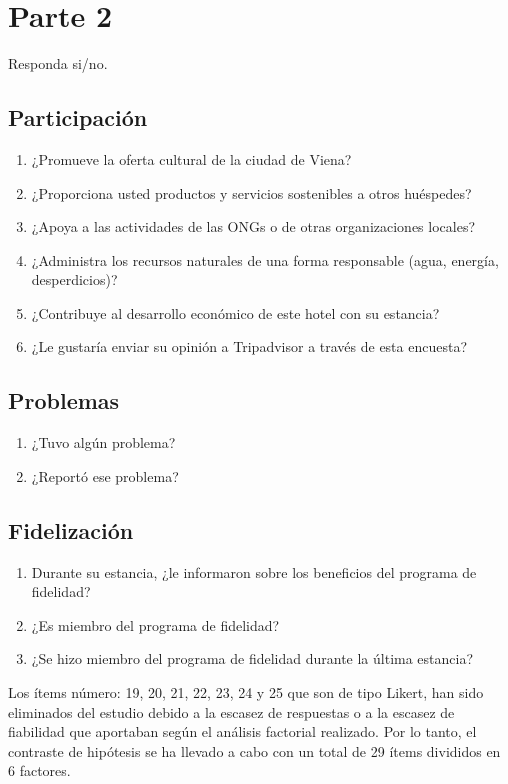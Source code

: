 \section*{Parte 2}
Responda si/no.


\subsection*{Participación}
\begin{enumerate}
	\item ¿Promueve la oferta cultural de la ciudad de Viena?
	\item ¿Proporciona usted productos y servicios sostenibles a otros huéspedes?
	\item ¿Apoya a las actividades de las ONGs o de otras organizaciones locales?
	\item ¿Administra los recursos naturales de una forma responsable (agua, energía, desperdicios)?
	\item ¿Contribuye al desarrollo económico de este hotel con su estancia?
	\item ¿Le gustaría enviar su opinión a Tripadvisor a través de esta encuesta?

\end{enumerate}

\subsection*{Problemas}
\begin{enumerate}
	\item ¿Tuvo algún problema?
	\item ¿Reportó ese problema?

\end{enumerate}

\subsection*{Fidelización}
\begin{enumerate}
	\item Durante su estancia, ¿le informaron sobre los beneficios del programa de fidelidad?
	\item ¿Es miembro del programa de fidelidad?
	\item ¿Se hizo miembro del programa de fidelidad durante la última estancia?

\end{enumerate}

Los ítems número: 19, 20, 21, 22, 23, 24 y 25 que son de tipo Likert, han sido eliminados del estudio debido a la escasez de respuestas o a la escasez de fiabilidad que aportaban según el análisis factorial realizado. Por lo tanto, el contraste de hipótesis se ha llevado a cabo con un total de 29 ítems divididos en 6 factores.

